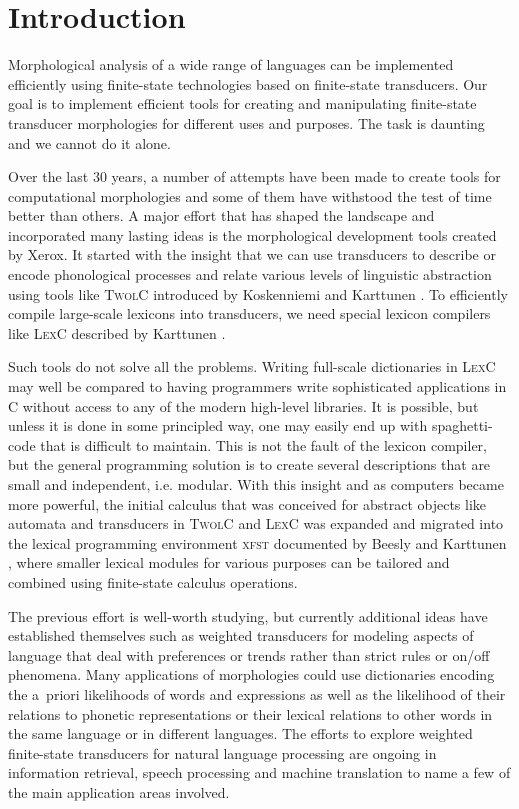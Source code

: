 \documentclass[a4paper]{article}
\begin{document}
\section{Introduction}

Morphological analysis of a wide range of languages can be implemented
efficiently using finite-state technologies based on finite-state
transducers. Our goal is to implement efficient tools for creating and
manipulating finite-state transducer morphologies for different uses
and purposes. The task is daunting and we cannot do it alone.

Over the last 30 years, a number of attempts have been made to create
tools for computational morphologies and some of them have withstood
the test of time better than others. A major effort that has shaped
the landscape and incorporated many lasting ideas is the morphological
development tools created by Xerox. It started with the insight that
we can use transducers to describe or encode phonological processes
and relate various levels of linguistic abstraction using tools like
\textsc{TwolC} introduced by Koskenniemi and Karttunen
\cite{Koskenniemi83,Karttunen87,Karttunen92}. To efficiently compile
large-scale lexicons into transducers, we need special lexicon
compilers like \textsc{LexC} described by Karttunen
\cite{Karttunen93,Karttunen94}.

Such tools do not solve all the problems. Writing full-scale
dictionaries in \textsc{LexC} may well be compared to having
programmers write sophisticated applications in C without access to
any of the modern high-level libraries. It is possible, but unless it
is done in some principled way, one may easily end up with
spaghetti-code that is difficult to maintain. This is not the fault of
the lexicon compiler, but the general programming solution is to
create several descriptions that are small and independent,
i.e. modular.  With this insight and as computers became more
powerful, the initial calculus that was conceived for abstract objects
like automata and transducers in \textsc{TwolC} and \textsc{LexC} was
expanded and migrated into the lexical programming environment
\textsc{xfst} documented by Beesly and Karttunen \cite{beesley03},
where smaller lexical modules for various purposes can be tailored and
combined using finite-state calculus operations.

The previous effort is well-worth studying, but currently additional
ideas have established themselves such as weighted transducers for
modeling aspects of language that deal with preferences or trends
rather than strict rules or on/off phenomena. Many applications of
morphologies could use dictionaries encoding the a~priori likelihoods
of words and expressions as well as the likelihood of their relations
to phonetic representations or their lexical relations to other words
in the same language or in different languages. The efforts to explore
weighted finite-state transducers for natural language processing are
ongoing in information retrieval, speech processing and machine
translation to name a few of the main application areas involved.
\end{document}
